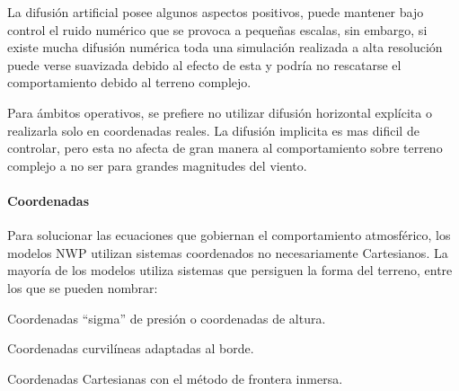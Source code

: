 La difusión artificial posee algunos aspectos positivos, puede mantener bajo control el ruido numérico que se provoca a pequeñas escalas, sin embargo, si existe mucha difusión numérica toda una simulación realizada a alta resolución puede verse suavizada debido al efecto de esta y podría no rescatarse el comportamiento debido al terreno complejo.

Para ámbitos operativos, se prefiere no utilizar difusión horizontal explícita o realizarla solo en coordenadas reales. La difusión implicita es mas dificil de controlar, pero esta no afecta de gran manera al comportamiento sobre terreno complejo a no ser para grandes magnitudes del viento. 
\paragraph{Coordenadas} Para solucionar las ecuaciones que gobiernan el comportamiento atmosférico, los modelos NWP utilizan sistemas coordenados no necesariamente Cartesianos. La mayoría de los modelos utiliza sistemas que persiguen la forma del terreno, entre los que se pueden nombrar:
\begin{itemize*}
	\item Coordenadas ``sigma'' de presión o coordenadas de altura.
	\item Coordenadas curvilíneas adaptadas al borde.
	\item Coordenadas Cartesianas con el método de frontera inmersa.
\end{itemize*}

